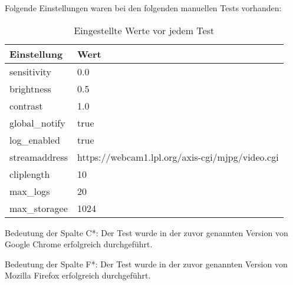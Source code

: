 Folgende Einstellungen waren bei den folgenden manuellen Tests vorhanden:

\begin{table}[]
	\begin{tabular}{|l|l|}
		\cline{1-2}
		\textbf{Einstellung} & \textbf{Wert} \\ \hline
		
		sensitivity & 0.0 \\ \hline
		
		brightness & 0.5 \\ \hline
		
		contrast & 1.0 \\ \hline
		
		global\_notify & true \\ \hline
		
		log\_enabled & true \\ \hline
		
		streamaddress & https://webcam1.lpl.org/axis-cgi/mjpg/video.cgi \\ \hline
		
		cliplength & 10 \\ \hline
		
		max\_logs & 20 \\ \hline
		
		max\_storagee & 1024 \\ \hline
	\end{tabular}
\caption{Eingestellte Werte vor jedem Test}
\label{tab:eingestellte_werte_vor_tests}
\end{table}

Bedeutung der Spalte C*: Der Test wurde in der zuvor genannten Version von Google Chrome erfolgreich durchgeführt.

Bedeutung der Spalte F*: Der Test wurde in der zuvor genannten Version von Mozilla Firefox erfolgreich durchgeführt.

